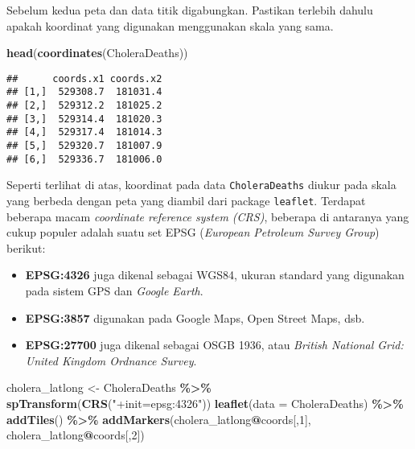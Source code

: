 \documentclass[
]{book}
\newenvironment{Shaded}{\begin{snugshade}}{\end{snugshade}}
\newcommand{\DataTypeTok}[1]{\textcolor[rgb]{0.13,0.29,0.53}{#1}}
\newcommand{\DecValTok}[1]{\textcolor[rgb]{0.00,0.00,0.81}{#1}}
\newcommand{\KeywordTok}[1]{\textcolor[rgb]{0.13,0.29,0.53}{\textbf{#1}}}
\newcommand{\NormalTok}[1]{#1}
\newcommand{\OperatorTok}[1]{\textcolor[rgb]{0.81,0.36,0.00}{\textbf{#1}}}
\newcommand{\StringTok}[1]{\textcolor[rgb]{0.31,0.60,0.02}{#1}}
\begin{document}
Sebelum kedua peta dan data titik digabungkan. Pastikan terlebih dahulu apakah koordinat yang digunakan menggunakan skala yang sama.

\begin{Shaded}
\begin{Highlighting}[]
\KeywordTok{head}\NormalTok{(}\KeywordTok{coordinates}\NormalTok{(CholeraDeaths))}
\end{Highlighting}
\end{Shaded}

\begin{verbatim}
##      coords.x1 coords.x2
## [1,]  529308.7  181031.4
## [2,]  529312.2  181025.2
## [3,]  529314.4  181020.3
## [4,]  529317.4  181014.3
## [5,]  529320.7  181007.9
## [6,]  529336.7  181006.0
\end{verbatim}

Seperti terlihat di atas, koordinat pada data \texttt{CholeraDeaths} diukur pada skala yang berbeda dengan peta yang diambil dari package \texttt{leaflet}. Terdapat beberapa macam \emph{coordinate reference system (CRS)}, beberapa di antaranya yang cukup populer adalah suatu set EPSG (\emph{European Petroleum Survey Group}) berikut:

\begin{itemize}
\item
  \textbf{EPSG:4326} juga dikenal sebagai WGS84, ukuran standard yang digunakan pada sistem GPS dan \emph{Google Earth}.
\item
  \textbf{EPSG:3857} digunakan pada Google Maps, Open Street Maps, dsb.
\item
  \textbf{EPSG:27700} juga dikenal sebagai OSGB 1936, atau \emph{British National Grid: United Kingdom Ordnance Survey}.
\end{itemize}

\begin{Shaded}
\begin{Highlighting}[]
\NormalTok{cholera\_latlong \textless{}{-}}\StringTok{ }\NormalTok{CholeraDeaths }\OperatorTok{\%\textgreater{}\%}\StringTok{ }
\StringTok{  }\KeywordTok{spTransform}\NormalTok{(}\KeywordTok{CRS}\NormalTok{(}\StringTok{"+init=epsg:4326"}\NormalTok{))}
\KeywordTok{leaflet}\NormalTok{(}\DataTypeTok{data =}\NormalTok{ CholeraDeaths) }\OperatorTok{\%\textgreater{}\%}\StringTok{ }
\StringTok{  }\KeywordTok{addTiles}\NormalTok{() }\OperatorTok{\%\textgreater{}\%}
\StringTok{  }\KeywordTok{addMarkers}\NormalTok{(cholera\_latlong}\OperatorTok{@}\NormalTok{coords[,}\DecValTok{1}\NormalTok{], cholera\_latlong}\OperatorTok{@}\NormalTok{coords[,}\DecValTok{2}\NormalTok{])}
\end{Highlighting}
\end{Shaded}
\end{document}
